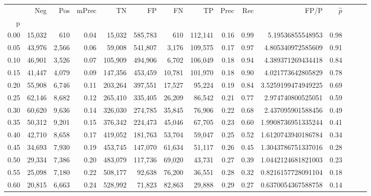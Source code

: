 \begin{tabular}{rrrrrrrrrrrrrrr}
\toprule
{} &     Neg &    Pos & mPrec &       TN &       FP &       FN &       TP &  Prec &   Rec &                  FP/P & $\hat{p}$ \\
p    &         &        &       &          &          &          &          &       &       &                       &           \\
\midrule
0.00 &  15,032 &    610 &  0.04 &   15,032 &  585,783 &      610 &  112,141 &  0.16 &  0.99 &      5.19536855548953 &      0.98 \\
0.05 &  43,976 &  2,566 &  0.06 &   59,008 &  541,807 &    3,176 &  109,575 &  0.17 &  0.97 &     4.805340972585609 &      0.91 \\
0.10 &  46,901 &  3,526 &  0.07 &  105,909 &  494,906 &    6,702 &  106,049 &  0.18 &  0.94 &     4.389371269434418 &      0.84 \\
0.15 &  41,447 &  4,079 &  0.09 &  147,356 &  453,459 &   10,781 &  101,970 &  0.18 &  0.90 &     4.021773642805829 &      0.78 \\
0.20 &  55,908 &  6,746 &  0.11 &  203,264 &  397,551 &   17,527 &   95,224 &  0.19 &  0.84 &    3.5259199474949225 &      0.69 \\
0.25 &  62,146 &  8,682 &  0.12 &  265,410 &  335,405 &   26,209 &   86,542 &  0.21 &  0.77 &     2.974740800525051 &      0.59 \\
0.30 &  60,620 &  9,636 &  0.14 &  326,030 &  274,785 &   35,845 &   76,906 &  0.22 &  0.68 &     2.437095901588456 &      0.49 \\
0.35 &  50,312 &  9,201 &  0.15 &  376,342 &  224,473 &   45,046 &   67,705 &  0.23 &  0.60 &    1.9908736951335244 &      0.41 \\
0.40 &  42,710 &  8,658 &  0.17 &  419,052 &  181,763 &   53,704 &   59,047 &  0.25 &  0.52 &    1.6120743940186784 &      0.34 \\
0.45 &  34,693 &  7,930 &  0.19 &  453,745 &  147,070 &   61,634 &   51,117 &  0.26 &  0.45 &    1.3043786751337016 &      0.28 \\
0.50 &  29,334 &  7,386 &  0.20 &  483,079 &  117,736 &   69,020 &   43,731 &  0.27 &  0.39 &    1.0442124681821003 &      0.23 \\
0.55 &  25,098 &  7,180 &  0.22 &  508,177 &   92,638 &   76,200 &   36,551 &  0.28 &  0.32 &    0.8216157728091104 &      0.18 \\
0.60 &  20,815 &  6,663 &  0.24 &  528,992 &   71,823 &   82,863 &   29,888 &  0.29 &  0.27 &    0.6370054367588758 &      0.14 \\

\end{tabular}

